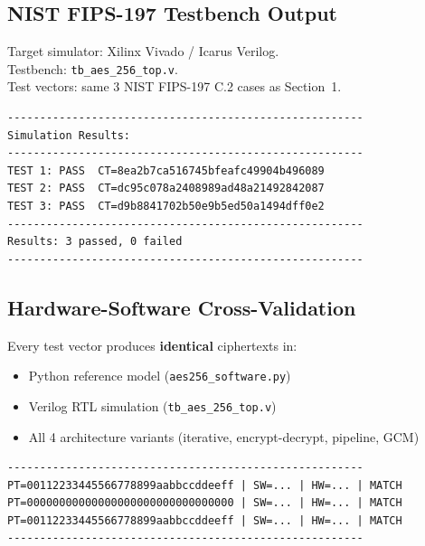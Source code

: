 \documentclass[11pt,a4paper]{article}
\begin{document}
\subsection{NIST FIPS-197 Testbench Output}

Target simulator: Xilinx Vivado / Icarus Verilog.\\
Testbench: \texttt{tb\_aes\_256\_top.v}.\\
Test vectors: same 3 NIST FIPS-197 C.2 cases as Section~1.

\begin{lstlisting}[style=terminal]
-------------------------------------------------------
Simulation Results:
-------------------------------------------------------
TEST 1: PASS  CT=8ea2b7ca516745bfeafc49904b496089
TEST 2: PASS  CT=dc95c078a2408989ad48a21492842087
TEST 3: PASS  CT=d9b8841702b50e9b5ed50a1494dff0e2
-------------------------------------------------------
Results: 3 passed, 0 failed
-------------------------------------------------------
\end{lstlisting}

\begin{center}
\end{center}

\subsection{Hardware-Software Cross-Validation}

Every test vector produces \textbf{identical} ciphertexts in:
\begin{itemize}[nosep]
\item Python reference model (\texttt{aes256\_software.py})
\item Verilog RTL simulation (\texttt{tb\_aes\_256\_top.v})
\item All 4 architecture variants (iterative, encrypt-decrypt, pipeline, GCM)
\end{itemize}

\begin{lstlisting}[style=terminal]
-------------------------------------------------------
PT=00112233445566778899aabbccddeeff | SW=... | HW=... | MATCH
PT=00000000000000000000000000000000 | SW=... | HW=... | MATCH
PT=00112233445566778899aabbccddeeff | SW=... | HW=... | MATCH
-------------------------------------------------------
\end{lstlisting}
\end{document}
